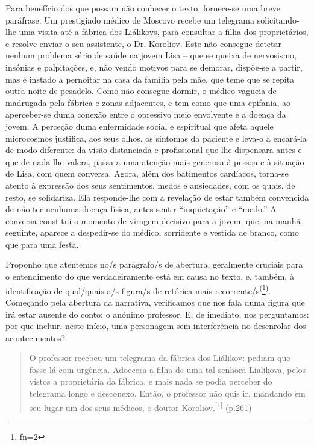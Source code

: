 \documentclass{article}
\makeatletter
\newcommand{\fn}{\afterassignment\fn@aux\count0=}
\newcommand{\fn@aux}{\csname fn\the\count0\endcsname}
\makeatother
\begin{document}
Para benefício dos que possam não conhecer o texto, fornece-se uma breve
paráfrase. Um prestigiado médico de Moscovo recebe um telegrama solicitando-lhe
uma visita até a fábrica dos Liálikovs, para consultar a filha dos
proprietários, e resolve enviar o seu assistente, o Dr. Koroliov. Este não
consegue detetar nenhum problema sério de saúde na jovem Lisa – que se queixa de
nervosismo, insónias e palpitações, e, não vendo motivos para se demorar,
dispõe-se a partir, mas é instado a pernoitar na casa da família pela mãe, que
teme que se repita outra noite de pesadelo. Como não consegue dormir, o médico
vagueia de madrugada pela fábrica e zonas adjacentes, e tem como que uma
epifania, ao aperceber-se duma conexão entre o opressivo meio envolvente e a
doença da jovem. A perceção duma enfermidade social e espiritual que afeta
aquele microcosmos justifica, aos seus olhos, os sintomas da paciente e leva-o a
encará-la de modo diferente: da visão distanciada e profissional que lhe
dispensara antes e que de nada lhe valera, passa a uma atenção mais generosa à
pessoa e à situação de Lisa, com quem conversa. Agora, além dos batimentos
cardíacos, torna-se atento à expressão dos seus sentimentos, medos e ansiedades,
com os quais, de resto, se solidariza. Ela responde-lhe com a revelação de estar
também convencida de não ter nenhuma doença física, antes sentir “inquietação” e
“medo.” A conversa constitui o momento de viragem decisivo para a jovem, que, na
manhã seguinte, aparece a despedir-se do médico, sorridente e vestida de branco,
como que para uma festa.

Proponho que atentemos no/s parágrafo/s de abertura, geralmente cruciais para o
entendimento do que verdadeiramente está em causa no texto, e, também, à
identificação de qual/quais a/s figura/s de retórica mais
recorrente/s\textsuperscript{(}\footnote{\fn2}\textsuperscript{)}. Começando pela abertura da narrativa, verificamos que nos fala duma figura que
irá estar ausente do conto: o anónimo professor. E, de imediato, nos
perguntamos: por que incluir, neste início, uma personagem sem interferência no
desenrolar dos acontecimentos?
\begin{quote}

O professor recebeu um telegrama da fábrica dos Liálikov: pediam que fosse lá
com urgência. Adoecera a filha de uma tal senhora Lialikova, pelos vistos a
proprietária da fábrica, e mais nada se podia perceber do telegrama longo e
desconexo. Então, o professor não quis ir, mandando em seu lugar um dos seus
médicos, o doutor Koroliov.\textsuperscript{[}\textsuperscript{1}\textsuperscript{]}
(p.261)

\end{quote}
\end{document}

